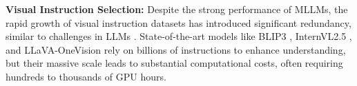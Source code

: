 \noindent
\textbf{Visual Instruction Selection:}  
Despite the strong performance of MLLMs, the rapid growth of visual instruction datasets has introduced significant redundancy, similar to challenges in LLMs \citep{zhou2024lima,chen2023maybe05dataneeded,xia2024lessselectinginfluentialdata}. State-of-the-art models like BLIP3 \citep{xue2024xgen}, InternVL2.5 \citep{chen2025expandingperformanceboundariesopensource}, and LLaVA-OneVision \citep{li2024llavaonevisioneasyvisualtask} rely on billions of instructions to enhance understanding, but their massive scale leads to substantial computational costs, often requiring hundreds to thousands of GPU hours.

